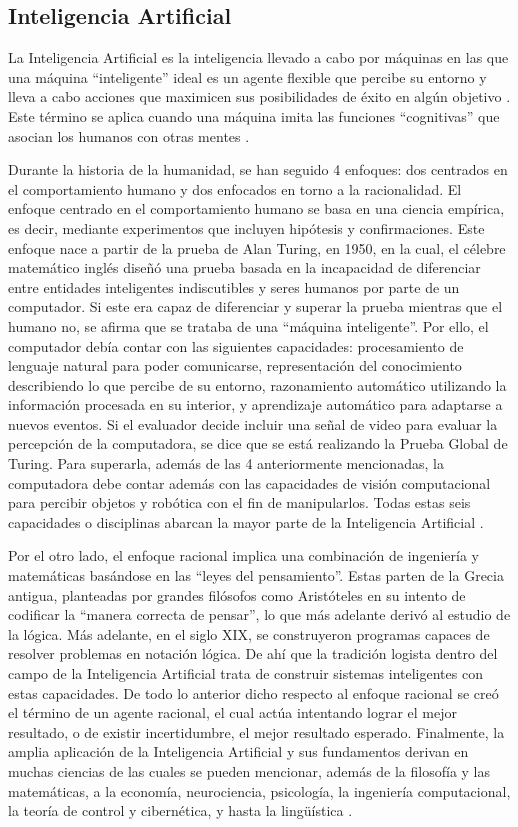 \subsection{Inteligencia Artificial}
La Inteligencia Artificial es la inteligencia llevado a cabo por máquinas en las que una máquina “inteligente” ideal es un agente flexible que percibe su entorno y lleva a cabo acciones que maximicen sus posibilidades de éxito en algún objetivo \parencite{tec_poole1998machinelearning}. Este término se aplica cuando una máquina imita las funciones “cognitivas” que asocian los humanos con otras mentes \parencite{bk_russell2009intart}.

Durante la historia de la humanidad, se han seguido 4 enfoques: dos centrados en el comportamiento humano y dos enfocados en torno a la racionalidad. El enfoque centrado en el comportamiento humano se basa en una ciencia empírica, es decir, mediante experimentos que incluyen hipótesis y confirmaciones. Este enfoque nace a partir de la prueba de Alan Turing, en 1950, en la cual, el célebre matemático inglés diseñó una prueba basada en la incapacidad de diferenciar entre entidades inteligentes indiscutibles y seres humanos por parte de un computador. Si este era capaz de diferenciar y superar la prueba mientras que el humano no, se afirma que se trataba de una “máquina inteligente”. Por ello, el computador debía contar con las siguientes capacidades: procesamiento de lenguaje natural para poder comunicarse, representación del conocimiento describiendo lo que percibe de su entorno, razonamiento automático utilizando la información procesada en su interior, y aprendizaje automático para adaptarse a nuevos eventos. Si el evaluador decide incluir una señal de video para evaluar la percepción de la computadora, se dice que se está realizando la Prueba Global de Turing. Para superarla, además de las 4 anteriormente mencionadas, la computadora debe contar además con las capacidades de visión computacional para percibir objetos y robótica con el fin de manipularlos. Todas estas seis capacidades o disciplinas abarcan la mayor parte de la Inteligencia Artificial \parencite{bk_russell2004intart}.

Por el otro lado, el enfoque racional implica una combinación de ingeniería y matemáticas basándose en las “leyes del pensamiento”. Estas parten de la Grecia antigua, planteadas por grandes filósofos como Aristóteles en su intento de codificar la “manera correcta de pensar”, lo que más adelante derivó al estudio de la lógica. Más adelante, en el siglo XIX, se construyeron programas capaces de resolver problemas en notación lógica. De ahí que la tradición logista dentro del campo de la Inteligencia Artificial trata de construir sistemas inteligentes con estas capacidades. De todo lo anterior dicho respecto al enfoque racional se creó el término de un agente racional, el cual actúa intentando lograr el mejor resultado, o de existir incertidumbre, el mejor resultado esperado. Finalmente, la amplia aplicación de la Inteligencia Artificial y sus fundamentos derivan en muchas ciencias de las cuales se pueden mencionar, además de la filosofía y las matemáticas, a la economía, neurociencia, psicología, la ingeniería computacional, la teoría de control y cibernética, y hasta la lingüística \parencite{bk_russell2004intart}.

